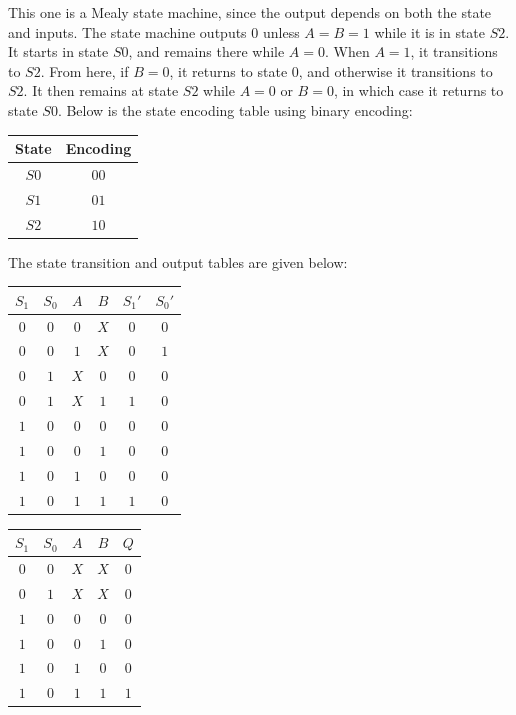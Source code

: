 \documentclass[12pt]{article}
\newenvironment{sol}[1][Solution]{\begin{trivlist}
		\item[\hskip \labelsep {\bfseries #1:}]}{\end{trivlist}}
\begin{document}
\begin{sol}
	This one is a Mealy state machine, since the output depends
	on both the state and inputs. The state machine outputs 0
	unless $A=B=1$ while it is in state $S2$.
	It starts in state $S0$, and remains there while $A=0$.
	When $A=1$, it transitions to $S2$. From here, if $B=0$,
	it returns to state 0, and otherwise it transitions to
	$S2$. It then remains at state $S2$ while $A=0$ or $B=0$,
	in which case it returns to state $S0$. Below is the state
	encoding table using binary encoding:
	\begin{center}
		\begin{tabular}{c|c}
			State & Encoding\\
			\hline
			$S0$ & $00$\\
			$S1$ & $01$\\
			$S2$ & $10$\\
		\end{tabular}
	\end{center}
	The state transition and output tables are given below:
	\begin{center}
		\begin{tabular}{cc|cc|cc}
			$S_1$ & $S_0$ & $A$ & $B$ & $S_1'$ & $S_0'$\\
			\hline
			$0$ & $0$ & $0$ & $X$ & $0$ & $0$\\
			$0$ & $0$ & $1$ & $X$ & $0$ & $1$\\
			$0$ & $1$ & $X$ & $0$ & $0$ & $0$\\
			$0$ & $1$ & $X$ & $1$ & $1$ & $0$\\
			$1$ & $0$ & $0$ & $0$ & $0$ & $0$\\
			$1$ & $0$ & $0$ & $1$ & $0$ & $0$\\
			$1$ & $0$ & $1$ & $0$ & $0$ & $0$\\
			$1$ & $0$ & $1$ & $1$ & $1$ & $0$
		\end{tabular}
		\quad
		\begin{tabular}{cc|cc|c}
			$S_1$ & $S_0$ & $A$ & $B$ & $Q$\\
			\hline
			$0$ & $0$ & $X$ & $X$ & $0$ \\
			$0$ & $1$ & $X$ & $X$ & $0$ \\
			$1$ & $0$ & $0$ & $0$ & $0$ \\
			$1$ & $0$ & $0$ & $1$ & $0$ \\
			$1$ & $0$ & $1$ & $0$ & $0$ \\
			$1$ & $0$ & $1$ & $1$ & $1$ \\
		\end{tabular}

\end{center}
\end{sol}
\end{document}
